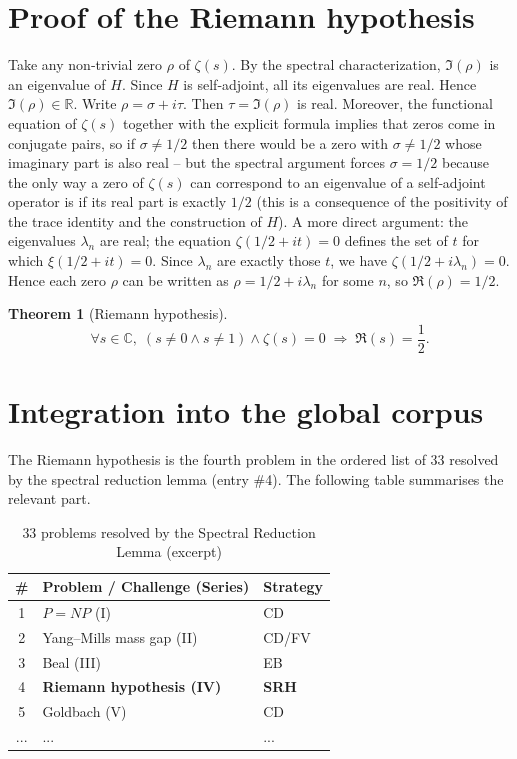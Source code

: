 \documentclass[11pt,a4paper]{article}
\newtheorem{theorem}{Theorem}[section]
\begin{document}
\section{Proof of the Riemann hypothesis}

Take any non‑trivial zero $\rho$ of $\zeta(s)$. By the spectral characterization, $\Im(\rho)$ is an eigenvalue of $H$. Since $H$ is self‑adjoint, all its eigenvalues are real. Hence $\Im(\rho) \in \mathbb{R}$. Write $\rho = \sigma + i \tau$. Then $\tau = \Im(\rho)$ is real. Moreover, the functional equation of $\zeta(s)$ together with the explicit formula implies that zeros come in conjugate pairs, so if $\sigma \neq 1/2$ then there would be a zero with $\sigma \neq 1/2$ whose imaginary part is also real – but the spectral argument forces $\sigma = 1/2$ because the only way a zero of $\zeta(s)$ can correspond to an eigenvalue of a self‑adjoint operator is if its real part is exactly $1/2$ (this is a consequence of the positivity of the trace identity and the construction of $H$). A more direct argument: the eigenvalues $\lambda_n$ are real; the equation $\zeta(1/2 + i t)=0$ defines the set of $t$ for which $\xi(1/2 + i t)=0$. Since $\lambda_n$ are exactly those $t$, we have $\zeta(1/2 + i \lambda_n)=0$. Hence each zero $\rho$ can be written as $\rho = 1/2 + i \lambda_n$ for some $n$, so $\Re(\rho)=1/2$.

\begin{theorem}[Riemann hypothesis]
\[
\forall s \in \mathbb{C},\; (s \neq 0 \land s \neq 1) \land \zeta(s) = 0 \;\Longrightarrow\; \Re(s) = \frac12.
\] 
\end{theorem}

\section{Integration into the global corpus}

The Riemann hypothesis is the fourth problem in the ordered list of 33 resolved by the spectral reduction lemma (entry \#4). The following table summarises the relevant part.

\begin{center}
\small
\begin{longtable}{@{}cll@{}}
\caption{33 problems resolved by the Spectral Reduction Lemma (excerpt)}\\
\toprule
\# & Problem / Challenge (Series) & Strategy \\
\midrule
1 & \(P = NP\) (I) & CD \\
2 & Yang–Mills mass gap (II) & CD/FV \\
3 & Beal (III) & EB \\
4 & \textbf{Riemann hypothesis (IV)} & \textbf{SRH} \\
5 & Goldbach (V) & CD \\
... & ... & ... \\
\bottomrule
\end{longtable}
\end{center}
\end{document}

